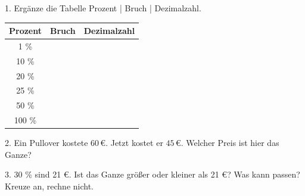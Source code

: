 \documentclass[11pt]{article}
\begin{document}
\pfheftstil
{}
\pfrueckblick
\begin{pfaufg}{}{1.}{}
Ergänze die Tabelle Prozent | Bruch | Dezimalzahl.
\par\smallskip\noindent \begingroup\renewcommand{\arraystretch}{1.3}\begin{tabular}{|c|c|c|}\hline \textbf{Prozent} & \textbf{Bruch} & \textbf{Dezimalzahl} \\ \hline 1 \% & \rule{0pt}{3ex}\hspace{1.6cm} & \rule{0pt}{3ex}\hspace{1.6cm} \\ \hline 10 \% & \rule{0pt}{3ex}\hspace{1.6cm} & \rule{0pt}{3ex}\hspace{1.6cm} \\ \hline 20 \% & \rule{0pt}{3ex}\hspace{1.6cm} & \rule{0pt}{3ex}\hspace{1.6cm} \\ \hline 25 \% & \rule{0pt}{3ex}\hspace{1.6cm} & \rule{0pt}{3ex}\hspace{1.6cm} \\ \hline 50 \% & \rule{0pt}{3ex}\hspace{1.6cm} & \rule{0pt}{3ex}\hspace{1.6cm} \\ \hline 100 \% & \rule{0pt}{3ex}\hspace{1.6cm} & \rule{0pt}{3ex}\hspace{1.6cm} \\ \hline\end{tabular}\endgroup\par
{}
\end{pfaufg}
\begin{pfaufg}{}{2.}{}
Ein Pullover kostete $60\,€$. Jetzt kostet er $45\,€$. Welcher Preis ist hier das Ganze?
\end{pfaufg}
\begin{pfaufg}{}{3.}{}
30 \% sind 21 €. Ist das Ganze größer oder kleiner als 21 €? Was kann passen? Kreuze an, rechne nicht.
\end{pfaufg}
\par{}\par
\end{document}
